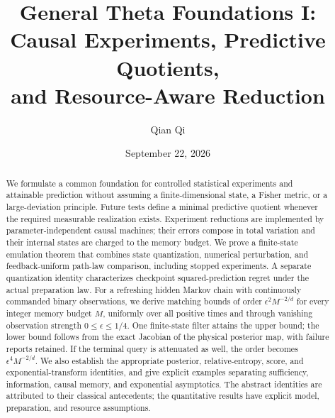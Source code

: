 
\title[General Theta Foundations I]{General Theta Foundations I:\\Causal Experiments, Predictive Quotients,\\and Resource-Aware Reduction}
\author{Qian Qi}
\date{September 22, 2026}

\begin{abstract}
We formulate a common foundation for controlled statistical experiments and
attainable prediction without assuming a finite-dimensional state, a Fisher
metric, or a large-deviation principle. Future tests define a minimal
predictive quotient whenever the required measurable realization exists.
Experiment reductions are implemented by parameter-independent causal
machines; their errors compose in total variation and their internal
states are charged to the memory budget. We prove a finite-state emulation
theorem that combines state quantization, numerical perturbation, and
feedback-uniform path-law comparison, including stopped experiments. A
separate quantization identity characterizes checkpoint squared-prediction
regret under the actual preparation law.
For a refreshing hidden Markov chain with continuously commanded binary
observations, we derive matching bounds of order
$\epsilon^2M^{-2/d}$ for every integer memory budget $M$, uniformly over
all positive times and through vanishing observation strength
$0\le\epsilon\le1/4$. One finite-state filter attains the upper bound;
the lower bound follows from the exact Jacobian of the physical posterior
map, with failure reports retained. If the terminal query is attenuated as
well, the order becomes $\epsilon^4M^{-2/d}$. We also establish the
appropriate posterior, relative-entropy, score, and exponential-transform
identities, and give explicit examples separating sufficiency, information,
causal memory, and exponential asymptotics. The abstract identities are
attributed to their classical antecedents; the quantitative results have
explicit model, preparation, and resource assumptions.
\end{abstract}
\maketitle
\tableofcontents












\appendix




